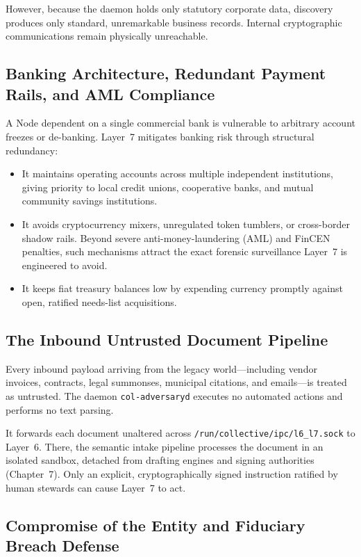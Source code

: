 However, because the daemon holds only statutory corporate data, discovery produces only standard, unremarkable business records. Internal cryptographic communications remain physically unreachable.

\subsection{Banking Architecture, Redundant Payment Rails, and AML Compliance}

A Node dependent on a single commercial bank is vulnerable to arbitrary account freezes or de-banking. Layer~7 mitigates banking risk through structural redundancy:
\begin{itemize}
  \item It maintains operating accounts across multiple independent institutions, giving priority to local credit unions, cooperative banks, and mutual community savings institutions.
  \item It avoids cryptocurrency mixers, unregulated token tumblers, or cross-border shadow rails. Beyond severe anti-money-laundering (AML) and FinCEN penalties, such mechanisms attract the exact forensic surveillance Layer~7 is engineered to avoid.
  \item It keeps fiat treasury balances low by expending currency promptly against open, ratified needs-list acquisitions.
\end{itemize}

\subsection{The Inbound Untrusted Document Pipeline}

Every inbound payload arriving from the legacy world—including vendor invoices, contracts, legal summonses, municipal citations, and emails—is treated as untrusted. The daemon \texttt{col-adversaryd} executes no automated actions and performs no text parsing.

It forwards each document unaltered across \texttt{/run/collective/ipc/l6\_l7.sock} to Layer~6. There, the semantic intake pipeline processes the document in an isolated sandbox, detached from drafting engines and signing authorities (Chapter~7). Only an explicit, cryptographically signed instruction ratified by human stewards can cause Layer~7 to act.

\subsection{Compromise of the Entity and Fiduciary Breach Defense}

